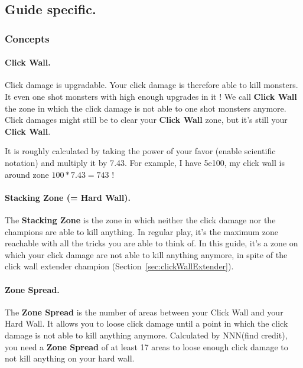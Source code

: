 \documentclass{article}
\begin{document}
\subsection{Guide specific.}

\subsubsection{Concepts}

\paragraph{Click Wall.}

Click damage is upgradable.
Your click damage is therefore able to kill monsters.
It even one shot monsters with high enough upgrades in it !
We call \textbf{Click Wall} the zone in which the click damage is not able to one shot monsters anymore.
Click damages might still be to clear your \textbf{Click Wall} zone, but it's still your \textbf{Click Wall}.

It is roughly calculated by taking the power of your favor (enable scientific notation) and multiply it by 7.43.
For example, I have 5e100, my click wall is around zone $100 * 7.43 = 743$ !

\paragraph{Stacking Zone (= Hard Wall).}

The \textbf{Stacking Zone} is the zone in which neither the click damage nor the champions are able to kill anything.
In regular play, it's the maximum zone reachable with all the tricks you are able to think of.
In this guide, it's a zone on which your click damage are not able to kill anything anymore, in spite of the click wall extender champion (Section~\ref{sec:clickWallExtender}).

\paragraph{Zone Spread.}

The \textbf{Zone Spread} is the number of areas between your Click Wall and your Hard Wall.
It allows you to loose click damage until a point in which the click damage is not able to kill anything anymore.
Calculated by NNN(find credit), you need a \textbf{Zone Spread} of at least 17 areas to loose enough click damage to not kill anything on your hard wall.
\end{document}
